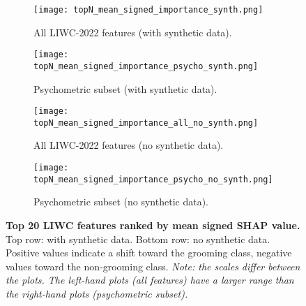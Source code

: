 \begin{figure}[H]
  \centering
  
  \begin{subfigure}[t]{0.49\textwidth}
    \centering
    \texttt{[image: topN\_mean\_signed\_importance\_synth.png]}
    \caption{All LIWC-2022 features (with synthetic data).}
    \label{fig:synth_all_shap}
  \end{subfigure}\hfill
  \begin{subfigure}[t]{0.49\textwidth}
    \centering
    \texttt{[image: topN\_mean\_signed\_importance\_psycho\_synth.png]}
    \caption{Psychometric subset (with synthetic data).}
    \label{fig:synth_psycho_shap}
  \end{subfigure}
  
  \vspace{0.5cm}
  
  \begin{subfigure}[t]{0.49\textwidth}
    \centering
    \texttt{[image: topN\_mean\_signed\_importance\_all\_no\_synth.png]}
    \caption{All LIWC-2022 features (no synthetic data).}
    \label{fig:no_synth_all_shap}
  \end{subfigure}\hfill
  \begin{subfigure}[t]{0.49\textwidth}
    \centering
    \texttt{[image: topN\_mean\_signed\_importance\_psycho\_no\_synth.png]}
    \caption{Psychometric subset (no synthetic data).}
    \label{fig:no_synth_psycho_shap}
  \end{subfigure}

  \caption[Top 20 LIWC features ranked by mean signed SHAP value.]{\textbf{Top 20 LIWC features ranked by mean signed SHAP value.} 
  Top row: with synthetic data. Bottom row: no synthetic data. 
  Positive values indicate a shift toward the grooming class, negative values toward the non-grooming class. 
  \textit{Note: the scales differ between the plots. The left-hand plots (all features) have a larger range than the right-hand plots (psychometric subset).}}
  \label{fig:feature_importance_by_class_combined}
\end{figure}

